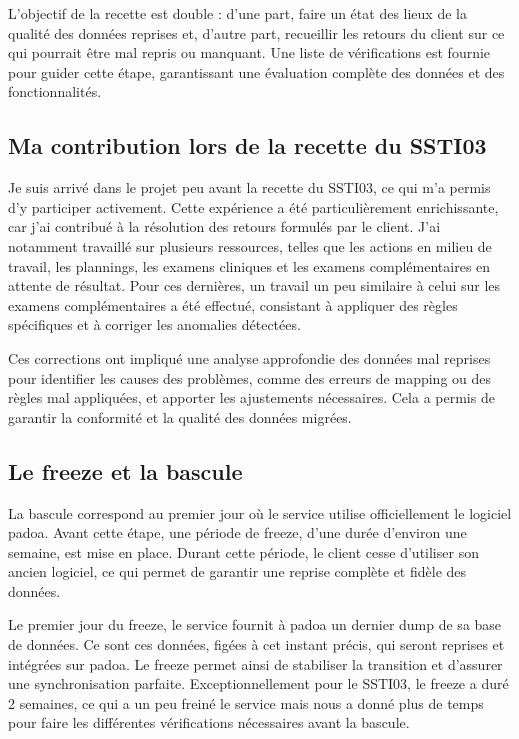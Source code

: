 L’objectif de la recette est double : d’une part, faire un état des lieux de la qualité des données reprises et, d’autre part, recueillir les retours du client sur ce qui pourrait être mal repris ou manquant. Une liste de vérifications est fournie pour guider cette étape, garantissant une évaluation complète des données et des fonctionnalités.

\subsection{Ma contribution lors de la recette du SSTI03}

Je suis arrivé dans le projet peu avant la recette du SSTI03, ce qui m’a permis d’y participer activement. Cette expérience a été particulièrement enrichissante, car j’ai contribué à la résolution des retours formulés par le client. J’ai notamment travaillé sur plusieurs ressources, telles que les actions en milieu de travail, les plannings, les examens cliniques et les examens complémentaires en attente de résultat. Pour ces dernières, un travail un peu similaire à celui sur les examens complémentaires a été effectué, consistant à appliquer des règles spécifiques et à corriger les anomalies détectées.

Ces corrections ont impliqué une analyse approfondie des données mal reprises pour identifier les causes des problèmes, comme des erreurs de mapping ou des règles mal appliquées, et apporter les ajustements nécessaires. Cela a permis de garantir la conformité et la qualité des données migrées.

\subsection{Le freeze et la bascule}

La bascule correspond au premier jour où le service utilise officiellement le logiciel padoa. Avant cette étape, une période de freeze, d’une durée d’environ une semaine, est mise en place. Durant cette période, le client cesse d’utiliser son ancien logiciel, ce qui permet de garantir une reprise complète et fidèle des données.

Le premier jour du freeze, le service fournit à padoa un dernier dump de sa base de données. Ce sont ces données, figées à cet instant précis, qui seront reprises et intégrées sur padoa. Le freeze permet ainsi de stabiliser la transition et d’assurer une synchronisation parfaite.
Exceptionnellement pour le SSTI03, le freeze a duré 2 semaines, ce qui a un peu freiné le service mais nous a donné plus de temps pour faire les différentes vérifications nécessaires avant la bascule.

